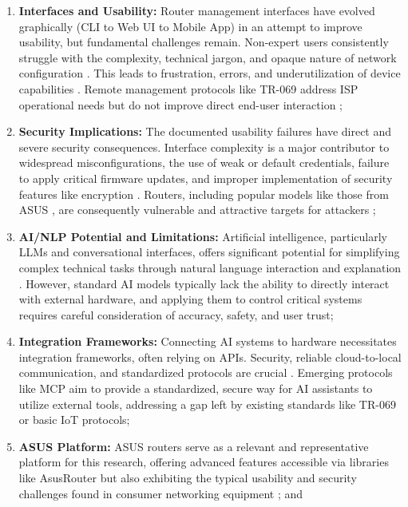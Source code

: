 \begin{enumerate}
\item \textbf{Interfaces and Usability:} Router management interfaces have evolved graphically (CLI to Web UI to Mobile App) in an attempt to improve usability, but fundamental challenges remain. Non-expert users consistently struggle with the complexity, technical jargon, and opaque nature of network configuration \cite{home_network_challenges}. This leads to frustration, errors, and underutilization of device capabilities \cite{diagnostic_issues}. Remote management protocols like TR-069 address ISP operational needs but do not improve direct end-user interaction \cite{router_security_vulnerabilities};

\item \textbf{Security Implications:} The documented usability failures have direct and severe security consequences. Interface complexity is a major contributor to widespread misconfigurations, the use of weak or default credentials, failure to apply critical firmware updates, and improper implementation of security features like encryption \cite{home_network_challenges}. Routers, including popular models like those from ASUS \cite{secure_router}, are consequently vulnerable and attractive targets for attackers \cite{router_exploitable};

\item \textbf{AI/NLP Potential and Limitations:} Artificial intelligence, particularly LLMs and conversational interfaces, offers significant potential for simplifying complex technical tasks through natural language interaction and explanation \cite{nlp_cybersecurity}. However, standard AI models typically lack the ability to directly interact with external hardware, and applying them to control critical systems requires careful consideration of accuracy, safety, and user trust;

\item \textbf{Integration Frameworks:} Connecting AI systems to hardware necessitates integration frameworks, often relying on APIs. Security, reliable cloud-to-local communication, and standardized protocols are crucial \cite{secure_router}. Emerging protocols like MCP aim to provide a standardized, secure way for AI assistants to utilize external tools, addressing a gap left by existing standards like TR-069 or basic IoT protocols;

\item \textbf{ASUS Platform:} ASUS routers serve as a relevant and representative platform for this research, offering advanced features accessible via libraries like AsusRouter but also exhibiting the typical usability and security challenges found in consumer networking equipment \cite{secure_router}; and


\end{enumerate}
